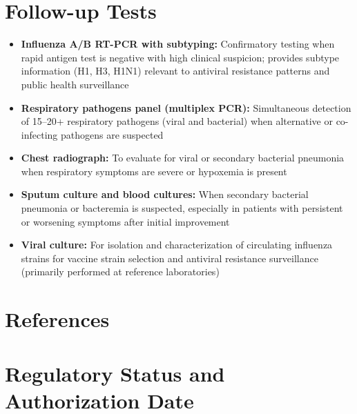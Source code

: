 \section*{Follow-up Tests}
\begin{itemize}
  \item \textbf{Influenza A/B RT-PCR with subtyping:} Confirmatory testing when rapid antigen test is negative with high clinical suspicion; provides subtype information (H1, H3, H1N1) relevant to antiviral resistance patterns and public health surveillance
  \item \textbf{Respiratory pathogens panel (multiplex PCR):} Simultaneous detection of 15--20+ respiratory pathogens (viral and bacterial) when alternative or co-infecting pathogens are suspected
  \item \textbf{Chest radiograph:} To evaluate for viral or secondary bacterial pneumonia when respiratory symptoms are severe or hypoxemia is present
  \item \textbf{Sputum culture and blood cultures:} When secondary bacterial pneumonia or bacteremia is suspected, especially in patients with persistent or worsening symptoms after initial improvement
  \item \textbf{Viral culture:} For isolation and characterization of circulating influenza strains for vaccine strain selection and antiviral resistance surveillance (primarily performed at reference laboratories)
\end{itemize}

\section*{References}



\clearpage
\section*{Regulatory Status and Authorization Date}

\clearpage
